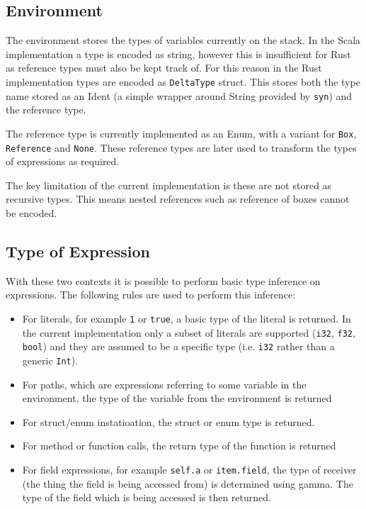 \documentclass[ oneside,%
                    author={James Elgar},
                    degree={MEng},
                     title={Bidirectional transformer between functional and \\ object-oriented programming in Rust},
                  subtitle={}]{dissertation}
\newcommand{\rust}[1]{\texttt{#1}}
\begin{document}
\subsection{Environment}

The environment stores the types of variables currently on the stack. 
In the Scala implementation a type is encoded as string, however this is insufficient for Rust as reference types must also be kept track of. For this reason in the Rust implementation types are encoded as \verb|DeltaType| struct. 
This stores both the type name stored as an Ident (a simple wrapper around String provided by \verb|syn|) and the reference type.

The reference type is currently implemented as an Enum, with a variant for \verb|Box|, \verb|Reference| and \verb|None|. These reference types are later used to transform the types of expressions as required.

The key limitation of the current implementation is these are not stored as recursive types. This means nested references such as reference of boxes cannot be encoded. 

\subsection{Type of Expression}

With these two contexts it is possible to perform basic type inference on expressions. The following rules are used to perform this inference:

\begin{itemize}
    \item For literals, for example \rust{1} or \rust{true}, a basic type of the literal is returned. In the current implementation only a subset of literals are supported (\rust{i32}, \rust{f32}, \rust{bool}) and they are assumed to be a specific type (i.e. \rust{i32} rather than a generic \verb|Int|).
    \item For paths, which are expressions referring to some variable in the environment, the type of the variable from the environment is returned 
    \item For struct/enum instatioation, the struct or enum type is returned.
    \item For method or function calls, the return type of the function is returned
    \item For field expressions, for example \rust{self.a} or \rust{item.field}, the type of receiver (the thing the field is being accessed from) is determined using gamma. The type of the field which is being accessed is then returned.
\end{itemize}
\end{document}
